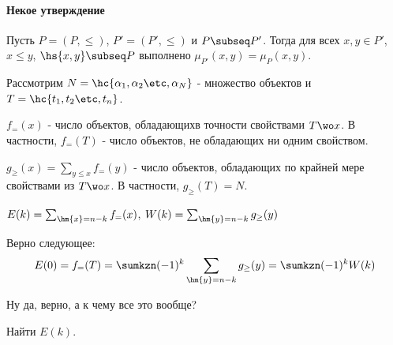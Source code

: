 \documentclass[unicode,10pt]{article}
\begin{document}
\paragraph{Некое утверждение}
Пусть $P=(P,\le)$, $P'=(P',\le)$ и $P\subseq P'$. Тогда для всех $x,y\in P'$, $x\le y$, $\hs{x,y}\subseq P$ выполнено
$\displaystyle \mu_{P'}(x,y)=\mu_{P}(x,y)$.
\begin{ex}
  Рассмотрим $N=\hc{\set{N}}$ - множество объектов и $T=\hc{\set[t]{n}}$.
  \begin{denote}
    $\displaystyle f_=(x)$ - число объектов, обладающихв точности свойствами $T\wo x$. В частности, $f_=(T)$ - число объектов,
    не обладающих ни одним свойством.
  \end{denote}
  \begin{denote}
    $\displaystyle g_\ge(x) = \sum_{y\le x}f_=(y)$ - число объектов, обладающих по крайней мере свойствами из $T\wo x$.
    В частности, $g_\ge(T)=N$.
  \end{denote}
  \begin{denotes}
    $E(k) = \sum_{\hm{x}=n-k}f_=(x)$, $W(k)=\sum_{\hm{y}=n-k}g_\ge(y)$
  \end{denotes}
  Верно следующее:
  \begin{displaymath}
    E(0)=f_=(T)=\sumkzn (-1)^k\sum_{\hm{y}=n-k}g_\ge(y)=\sumkzn(-1)^kW(k)
  \end{displaymath}
  \begin{authornote}
    Ну да, верно, а к чему все это вообще?
  \end{authornote}
  \begin{problem}
    Найти $E(k)$.
  \end{problem}
\end{ex}
\end{document}
